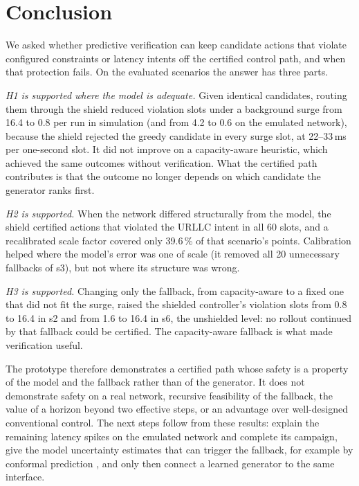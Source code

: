 \documentclass[conference]{IEEEtran}
\begin{document}
\section{Conclusion}

We asked whether predictive verification can keep candidate actions that violate
configured constraints or latency intents off the certified control path, and when
that protection fails. On the evaluated scenarios the answer has three parts.

\emph{H1 is supported where the model is adequate.} Given identical candidates,
routing them through the shield reduced violation slots under a background surge
from 16.4 to 0.8 per run in simulation (and from 4.2 to 0.6 on the emulated
network), because the shield rejected the greedy candidate in every surge slot, at
22--33\,ms per one-second slot. It did not improve on a capacity-aware heuristic,
which achieved the same outcomes without verification. What the certified path
contributes is that the outcome no longer depends on which candidate the generator
ranks first.

\emph{H2 is supported.} When the network differed structurally from the model, the
shield certified actions that violated the URLLC intent in all 60 slots, and a recalibrated scale factor covered only 39.6\,\% of that scenario's points. Calibration
helped where the model's error was one of scale (it removed all 20 unnecessary
fallbacks of s3), but not where its structure was wrong.

\emph{H3 is supported.} Changing only the fallback, from capacity-aware to a fixed
one that did not fit the surge, raised the shielded controller's violation slots from
0.8 to 16.4 in s2 and from 1.6 to 16.4 in s6, the unshielded level: no rollout
continued by that fallback could be certified. The capacity-aware fallback is what made verification useful.

The prototype therefore demonstrates a certified path whose safety is a property of
the model and the fallback rather than of the generator. It does not demonstrate
safety on a real network, recursive feasibility of the fallback, the value of a
horizon beyond two effective steps, or an advantage over well-designed conventional
control. The next steps follow from these results:
explain the remaining latency spikes on the emulated network and complete its
campaign, give the model uncertainty estimates that can trigger the fallback, for
example by conformal prediction \cite{angelopoulos2023conformal}, and only then
connect a learned generator to the same interface.



\end{document}

